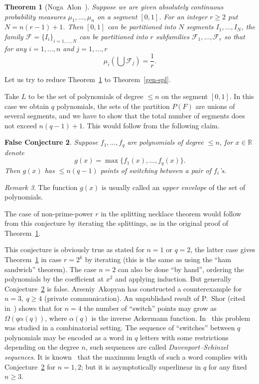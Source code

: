 \documentclass[12pt,a4paper,oneside]{amsart}
\newtheorem{thm}{Theorem}[section]
\newtheorem{fcon}[thm]{False Conjecture}
\theoremstyle{definition}
\theoremstyle{remark}
\newtheorem{rem}[thm]{Remark}
\numberwithin{equation}{section}
\begin{document}
\begin{thm}[Noga~Alon~\cite{alon1987}]
\label{alon-spl}
Suppose we are given absolutely continuous probability measures $\mu_1,\ldots, \mu_n$ on a segment $[0,1]$. For an integer $r\ge 2$ put $N=n(r-1)+1$. Then $[0,1]$ can be partitioned into $N$ segments $I_1, \ldots, I_N$, the family $\mathcal F = \{I_i\}_{i=1,\ldots, N}$ can be partitioned into $r$ subfamilies $\mathcal F_1,\ldots, \mathcal F_r$ so that for any $i=1,\ldots, n$ and $j=1,\ldots, r$
$$
\mu_i\left(\bigcup \mathcal F_j\right) = \frac{1}{r}.
$$
\end{thm}

Let us try to reduce Theorem~\ref{alon-spl} to Theorem~\ref{gen-spl}.

Take $L$ to be the set of polynomials of degree $\le n$ on the segment $[0, 1]$. In this case we obtain $q$ polynomials, the sets of the partition $P(F)$ are unions of several segments, and we have to show that the total number of segments does not exceed $n(q-1)+1$. This would follow from the following claim.

\begin{fcon}
\label{pol-sup}
Suppose $f_1,\ldots, f_q$ are polynomials of degree $\le n$, for $x\in\mathbb R$ denote
$$
g(x) = \max\{f_1(x), \ldots, f_q(x)\}.
$$
Then $g(x)$ has $\le n(q-1)$ points of switching between a pair of $f_i$'s.
\end{fcon}

\begin{rem}
The function $g(x)$ is usually called an \emph{upper envelope} of the set of polynomials.
\end{rem}

The case of non-prime-power $r$ in the splitting necklace theorem would follow from this conjecture by iterating the splittings, as in the original proof of Theorem~\ref{alon-spl}.

This conjecture is obviously true as stated for $n=1$ or $q=2$, the latter case gives Theorem~\ref{alon-spl} in case $r=2^k$ by iterating (this is the same as using the ``ham sandwich'' theorem). The case $n=2$ can also be done ``by hand'', ordering the polynomials by the coefficient at $x^2$ and applying induction. But generally Conjecture~\ref{pol-sup} is false. Arseniy~Akopyan has constructed a counterexample for $n=3,\ q\ge 4$ (private communication). An unpublished result of P.~Shor (cited in~\cite{agsh1995}) shows that for $n=4$ the number of ``switch'' points may grow as $\Omega(q\alpha(q))$, where $\alpha(q)$ is the inverse Ackermann function. In~\cite{agsh1995} this problem was studied in a combinatorial setting. The sequence of ``switches'' between $q$ polynomials may be encoded as a word in $q$ letters with some restrictions depending on the degree $n$, such sequences are called \emph{Davenport--Schinzel sequences}. It is known~\cite{agsh1995} that the maximum length of such a word complies with Conjecture~\ref{pol-sup} for $n=1,2$; but it is asymptotically superlinear in $q$ for any fixed $n\ge 3$.
\end{document}
